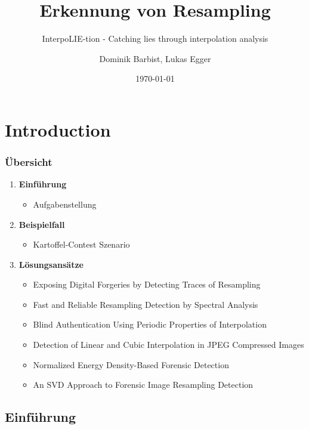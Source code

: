 \documentclass[11pt,t,usepdftitle=false,aspectratio=169]{beamer}
\title[Erkennung von Resampling]{Erkennung von Resampling}
\subtitle{InterpoLIE-tion - Catching lies through interpolation analysis}
\author[Dominik Barbist, Lukas Egger]{Dominik Barbist, Lukas Egger \\ \vspace{0.5em}}
\date{\today}
\begin{document}
\section{Introduction}

\begin{frame}
	\frametitle{Übersicht}
	\begin{enumerate}
		\item \textbf{Einführung}
		\begin{itemize}
			\item Aufgabenstellung
		\end{itemize}
		\item \textbf{Beispielfall}
		\begin{itemize}
			\item Kartoffel-Contest Szenario
		\end{itemize}
		\item \textbf{Lösungsansätze}
		\begin{itemize}
			\item Exposing Digital Forgeries by Detecting Traces of Resampling
			\item Fast and Reliable Resampling Detection by Spectral Analysis
			\item Blind Authentication Using Periodic Properties of Interpolation
			\item Detection of Linear and Cubic Interpolation in JPEG Compressed Images
			\item Normalized Energy Density-Based Forensic Detection
			\item An SVD Approach to Forensic Image Resampling Detection
		\end{itemize}
	\end{enumerate}
\end{frame}

\subsection{Einführung}
\end{document}
